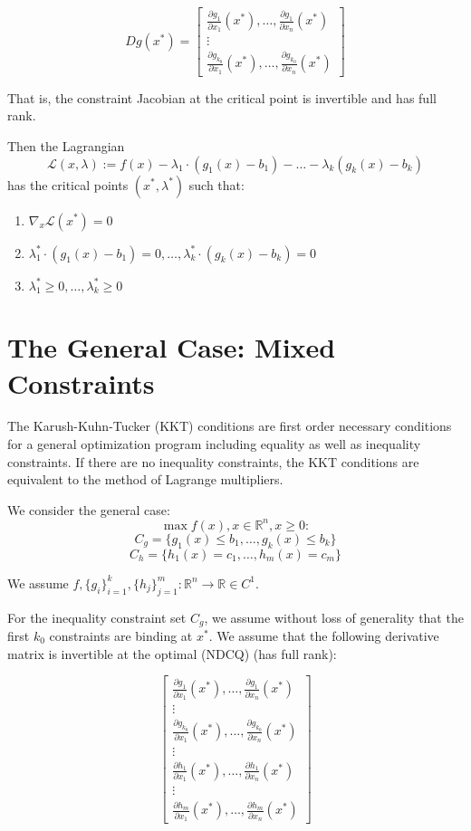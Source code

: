 \documentclass[11pt,]{article}
\providecommand{\tightlist}{%
  \setlength{\itemsep}{0pt}\setlength{\parskip}{0pt}}
\begin{document}
\[
Dg(x^*) = \begin{bmatrix}
\frac{\partial g_1}{\partial x_1}(x^*), \hdots, \frac{\partial g_1}{\partial x_n}(x^*)\\
\vdots\\
\frac{\partial g_{k_0}}{\partial x_1}(x^*), \hdots, \frac{\partial g_{k_0}}{\partial x_n}(x^*)
\end{bmatrix}
\]

That is, the constraint Jacobian at the critical point is invertible and
has full rank.

Then the Lagrangian
\[\mathcal{L}(x,\lambda):=f(x)-\lambda_1\cdot(g_1(x)-b_1)-\hdots-\lambda_k(g_k(x)-b_k)\]
has the critical points \((x^*,\lambda^*)\) such that:

\begin{enumerate}
\def\labelenumi{\arabic{enumi}.}
\tightlist
\item
  \(\nabla_x\mathcal{L}(x^*)=0\)
\item
  \(\lambda_1^*\cdot(g_1(x)-b_1)=0,\hdots,\lambda_k^*\cdot(g_k(x)-b_k)=0\)
\item
  \(\lambda_1^*\geq 0,\hdots, \lambda_k^*\geq 0\)
\end{enumerate}

\section{The General Case: Mixed
Constraints}\label{the-general-case-mixed-constraints}

The Karush-Kuhn-Tucker (KKT) conditions are first order necessary
conditions for a general optimization program including equality as well
as inequality constraints. If there are no inequality constraints, the
KKT conditions are equivalent to the method of Lagrange multipliers.

We consider the general case: \[\max f(x), x\in \mathbb{R}^n, x\geq 0:\]
\[C_g=\{g_1(x)\leq b_1,\hdots,g_k(x)\leq b_k\}\]
\[C_h=\{h_1(x)=c_1,\hdots,h_m(x)=c_m\}\]

We assume
\(f,\{g_i\}_{i=1}^k,\{h_j\}_{j=1}^m:\mathbb{R}^n\to \mathbb{R}\in C^1\).

For the inequality constraint set \(C_g\), we assume without loss of
generality that the first \(k_0\) constraints are binding at \(x^*\). We
assume that the following derivative matrix is invertible at the optimal
(NDCQ) (has full rank):

\[
\begin{bmatrix}
\frac{\partial g_1}{\partial x_1}(x^*),\hdots,\frac{\partial g_{1}}{\partial x_n}(x^*)\\
\vdots\\
\frac{\partial g_{k_0}}{\partial x_1}(x^*),\hdots,\frac{\partial g_{k_0}}{\partial x_n}(x^*)\\
\vdots\\
\frac{\partial h_1}{\partial x_1}(x^*),\hdots,\frac{\partial h_1}{\partial x_n}(x^*)\\
\vdots\\
\frac{\partial h_m}{\partial x_1}(x^*),\hdots,\frac{\partial h_m}{\partial x_n}(x^*)
\end{bmatrix}
\]
\end{document}

